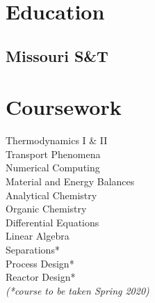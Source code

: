 \documentclass[]{deedy-resume-openfont}
\begin{document}
%
%
\lastupdated

%
%



%
%

\begin{minipage}[t]{0.33\textwidth} 


\section{Education} 
\sectionsep
\subsection{Missouri S\&T}
\sectionsep
{}
\sectionsep


\section{Coursework}
\sectionsep
Thermodynamics I \& II \\
Transport Phenomena \\
Numerical Computing \\
Material and Energy Balances \\
Analytical Chemistry \\
Organic Chemistry \\
Differential Equations \\
Linear Algebra \\
Separations* \\
Process Design* \\
Reactor Design* \\
{\footnotesize \textit{{(*course to be taken Spring 2020) }}} \\
\sectionsep



\end{minipage}
\end{document}
